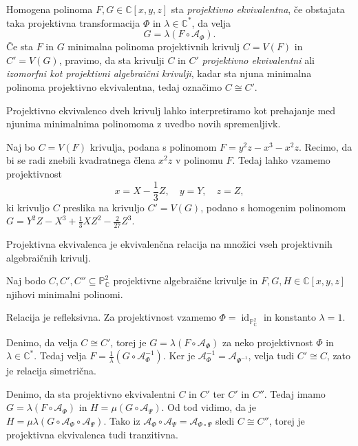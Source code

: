 \documentclass[mat1]{fmfdelo}
\numberwithin{equation}{section}
\newcommand{\C}{\mathbb C}
\newcommand{\CM}{\mathbb C ^*}
\newcommand{\PC}{\mathbb{P}^2_\C}
\newcommand{\Cxyz}{\C[x,y,z]}
\newcommand{\inv}{^{-1}}
\newcommand{\kom}[1]{
    \underline{//#1}
}
\DeclareMathOperator{\id}{id}
\theoremstyle{definition}
\begin{document}
\begin{definicija}
    Homogena polinoma $F,G \in \Cxyz$ sta \emph{projektivno ekvivalentna}, če obstajata taka projektivna transformacija $\Phi$ in $\lambda \in \CM$, da velja
    $$ G = \lambda (F \circ \mathcal{A}_\Phi). $$
    Če sta $F$ in $G$ minimalna polinoma projektivnih krivulj $C = V(F)$ in $C' = V(G)$, pravimo, da sta krivulji $C$ in $C'$ \emph{projektivno ekvivalentni} ali \emph{izomorfni kot projektivni algebraični krivulji}, kadar sta njuna minimalna polinoma projektivno ekvivalentna, tedaj označimo $C \cong C'$. 
\end{definicija}

Projektivno ekvivalenco dveh krivulj lahko interpretiramo kot prehajanje med njunima minimalnima polinomoma z uvedbo novih spremenljivk.

\begin{zgled*}
    \label{zgled projektivne ekviv.}
    Naj bo $C = V(F)$ krivulja, podana s polinomom $F = y^2z - x^3 - x^2z$. Recimo, da bi se radi znebili kvadratnega člena $x^2z$ v polinomu $F$. Tedaj lahko vzamemo projektivnost 
    \[
        x = X - \frac{1}{3}Z, \quad y = Y, \quad z = Z,
    \]
    ki krivuljo $C$ preslika na krivuljo $C' = V(G)$, podano s homogenim polinomom $G = Y^2Z - X^3 + \frac13 XZ^2 - \frac{2}{27}Z^3$. 
\end{zgled*}

\begin{trditev}
    Projektivna ekvivalenca je ekvivalenčna relacija na množici vseh projektivnih algebraičnih krivulj.
\end{trditev}

\begin{dokaz}
    Naj bodo $C, C', C'' \subseteq \PC$ projektivne algebraične krivulje in $F, G, H \in \Cxyz$ njihovi minimalni polinomi. 
    \par Relacija je refleksivna. Za projektivnost vzamemo $\Phi = \id_{\PC}$ in konstanto $\lambda = 1$. 
    \par Denimo, da velja $C \cong C'$, torej je $G = \lambda (F \circ \mathcal{A}_\Phi)$ za neko projektivnost $\Phi$ in $\lambda \in \CM$. Tedaj velja $F = \frac{1}{\lambda} (G \circ \mathcal{A}_\Phi\inv)$. Ker je $\mathcal{A}_\Phi\inv = \mathcal{A}_{\Phi\inv}$, velja tudi $C' \cong C$, zato je relacija simetrična. 
    \par Denimo, da sta projektivno ekvivalentni $C$ in $C'$ ter $C'$ in $C''$. Tedaj imamo $G = \lambda (F \circ \mathcal{A}_\Phi)$ in $H = \mu (G \circ \mathcal{A}_\Psi)$. Od tod vidimo, da je $H = \mu\lambda(G \circ \mathcal{A}_\Phi \circ \mathcal{A}_\Psi)$. Tako iz $\mathcal{A}_\Phi \circ \mathcal{A}_\Psi = \mathcal{A}_{\Phi \circ \Psi}$ sledi $C \cong C''$, torej je projektivna ekvivalenca tudi tranzitivna. 
\end{dokaz}
\end{document}
